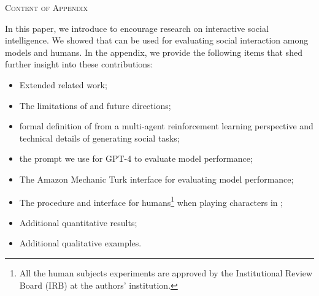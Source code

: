 \clearpage
\appendix
{}

\begin{center}
\Large
\textsc{Content of Appendix}
\end{center}

In this paper, we introduce \sotopia to encourage research on interactive social intelligence. We showed that \sotopia can be used for evaluating social interaction among models and humans. In the appendix, we provide the following items that shed further insight into these contributions:
\begin{itemize}
    \item[\ref{app:extended_related_work}] Extended related work;
    \item[\ref{sec:limitations}] The limitations of \sotopia and future directions;
    \item[\ref{app:formal_formulation}] formal definition of \sotopia from a multi-agent reinforcement learning perspective and technical details of generating social tasks;
    \item[\ref{app:eval_instructions}] the prompt we use for GPT-4 \citep{openai2023gpt4} to evaluate model performance;
    \item[\ref{app:human_annotation}] The Amazon Mechanic Turk interface for evaluating model performance;
    \item[\ref{app:human_performance}] The procedure and interface for humans\footnote{All the human subjects experiments are approved by the Institutional Review Board (IRB) at the authors' institution.} when playing characters in \sotopia;
    \item[\ref{app:additional_results}] Additional quantitative results;
    \item[\ref{app:qualitative_examples}] Additional qualitative examples.
\end{itemize}
















